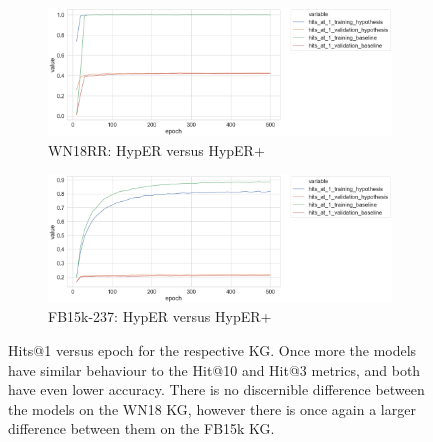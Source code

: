 
\begin{figure}[H]
	\begin{subfigure}[b]{.5\linewidth}
   		\centering
    		\includegraphics[width=1.0\linewidth, height=0.6\linewidth]{WN18RR_hits_at_1_Results}
		\captionsetup{justification=centering}
		\caption{WN18RR: HypER versus HypER+}
	\end{subfigure}
	\begin{subfigure}[b]{.5\linewidth}
   		\centering
		\includegraphics[width=1.0\linewidth, height=0.6\linewidth]{FB15k-237_hits_at_1_Results}
		\captionsetup{justification=centering}
		\caption{FB15k-237: HypER versus HypER+}
	\end{subfigure}
	\captionsetup{justification=centering}
	\caption{Hits@1 versus epoch for the respective KG. Once more the models have similar behaviour to the Hit@10 and Hit@3 metrics, and both have even lower accuracy. There is no discernible difference between the models on the WN18 KG, however there is once again a larger difference between them on the FB15k KG. }
\end{figure}

